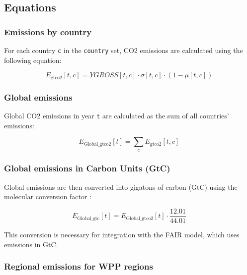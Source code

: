 \documentclass[
]{article}
\begin{document}
\subsection{Equations}\label{equations-2}

\subsubsection{Emissions by country}\label{emissions-by-country}

For each country \texttt{c} in the \texttt{country} set, CO2 emissions
are calculated using the following equation:

\begin{equation}
 E_{\text{gtco2}}[t,c] = YGROSS[t,c] \cdot \sigma[t,c] \cdot (1-\mu[t,c]) 
\end{equation}


\subsubsection{Global emissions}\label{global-emissions}

Global CO2 emissions in year \texttt{t} are calculated as the sum of all
countries' emissions:

\begin{equation}
 E_{\text{Global\_gtco2}}[t] = \sum_{c} E_{\text{gtco2}}[t,c] 
\end{equation}


\subsubsection{Global emissions in Carbon Units
(GtC)}\label{global-emissions-in-carbon-units-gtc}

Global emissions are then converted into gigatons of carbon (GtC) using
the molecular conversion factor :

\begin{equation}
 E_{\text{Global\_gtc}}[t] = E_{\text{Global\_gtco2}}[t] \cdot \frac{12.01}{44.01} 
\end{equation}


This conversion is necessary for integration with the FAIR model, which
uses emissions in GtC.

\subsubsection{Regional emissions for WPP
regions}\label{regional-emissions-for-wpp-regions}
\end{document}
